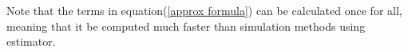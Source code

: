 Note that the terms in equation(\eqref{approx formula}) can be calculated once for all, meaning that it be computed much faster than simulation methods using estimator.





